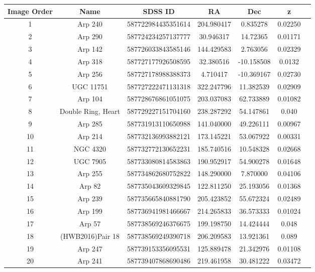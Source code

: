 \begin{table}
    \centering
    \begin{tabular}{|c|c|c|c|c|c|c|}
    \hline
         Image Order & Name & SDSS ID & RA & Dec & z \\
         \hline
         1 & Arp 240 & 587722984435351614 & 204.980417 & 0.835278 & 0.02250 \\
         2 & Arp 290 & 587724234257137777 & 30.946317 & 14.72365 & 0.01171 \\
         3 & Arp 142 & 587726033843585146 & 144.429583 & 2.763056 & 0.02329 \\
         4 & Arp 318 & 587727177926508595 & 32.380516 & -10.158508 & 0.0132 \\
         5 & Arp 256 & 587727178988388373 & 4.710417 & -10.369167 & 0.02730 \\
         6 & UGC 11751 & 587727222471131318 & 322.247796 & 11.382539 & 0.02909 \\
         7 & Arp 104 & 587728676861051075 & 203.037083 & 62.733889 & 0.01082 \\
         8 & Double Ring, Heart & 587729227151704160 & 238.287292 & 54.147861 & 0.040 \\
         9 & Arp 285 & 587731913110650988 & 141.040000 & 49.226111 & 0.00967 \\
         10 & Arp 214 & 587732136993882121 & 173.145221 & 53.067922 & 0.00331 \\
         11 & NGC 4320 & 587732772130652231 & 185.740516 & 10.548328 & 0.02668 \\
         12 & UGC 7905 & 587733080814583863 & 190.952917 & 54.900278 & 0.01648 \\
         13 & Arp 255 & 587734862680752822 & 148.290000 & 7.870000 & 0.04106 \\
         14 & Arp 82 & 587735043609329845 & 122.811250 & 25.193056 & 0.01368 \\
         15 & Arp 239 & 587735665840881790 & 205.423852 & 55.672324 & 0.02489 \\
         16 & Arp 199 & 587736941981466667 & 214.265833 & 36.573333 & 0.01024 \\
         17 & Arp 57 & 587738569246376675 & 199.198750 & 14.424444 & 0.048 \\
         18 & (HWB2016)Pair 18 & 587738569249390718 & 206.209583 & 13.921361 & 0.089 \\
         19 & Arp 247 & 587739153356095531 & 125.889478 & 21.342976 & 0.01108 \\
         20 & Arp 241 & 587739407868690486 & 219.461958 & 30.481222 & 0.03472 \\

\end{tabular}
\end{table}
